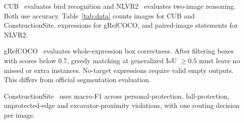 CUB~\cite{cub} evaluates bird recognition and NLVR2~\cite{nlvr2} evaluates two-image reasoning. Both use accuracy. Table~\ref{tab:data} counts images for CUB and ConstructionSite, expressions for gRefCOCO, and paired-image statements for NLVR2.

gRefCOCO~\cite{gref} evaluates whole-expression box correctness. After filtering boxes with scores below 0.7, greedy matching at generalized IoU $\geq 0.5$ must leave no missed or extra instances. No-target expressions require valid empty outputs. This differs from official segmentation evaluation.

ConstructionSite~\cite{construction} uses macro-F1 across personal-protection, fall-protection, unprotected-edge and excavator-proximity violations, with one routing decision per image.
